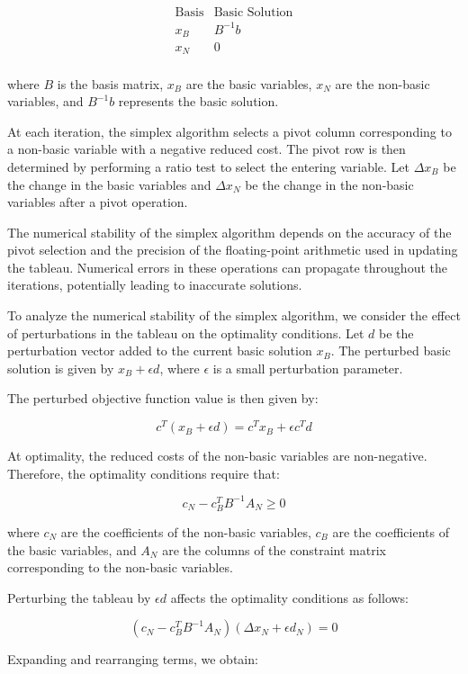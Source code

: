 \documentclass[12pt]{book} %
\begin{document}
\[
\begin{array}{c|c}
\text{Basis} & \text{Basic Solution} \\
\hline
x_B & B^{-1}b \\
\hline
x_N & 0 \\
\end{array}
\]

where $B$ is the basis matrix, $x_B$ are the basic variables, $x_N$ are the non-basic variables, and $B^{-1}b$ represents the basic solution.

At each iteration, the simplex algorithm selects a pivot column corresponding to a non-basic variable with a negative reduced cost. The pivot row is then determined by performing a ratio test to select the entering variable. Let $\Delta x_B$ be the change in the basic variables and $\Delta x_N$ be the change in the non-basic variables after a pivot operation.

The numerical stability of the simplex algorithm depends on the accuracy of the pivot selection and the precision of the floating-point arithmetic used in updating the tableau. Numerical errors in these operations can propagate throughout the iterations, potentially leading to inaccurate solutions.

To analyze the numerical stability of the simplex algorithm, we consider the effect of perturbations in the tableau on the optimality conditions. Let $d$ be the perturbation vector added to the current basic solution $x_B$. The perturbed basic solution is given by $x_B + \epsilon d$, where $\epsilon$ is a small perturbation parameter.

The perturbed objective function value is then given by:

\[
c^T(x_B + \epsilon d) = c^Tx_B + \epsilon c^Td
\]

At optimality, the reduced costs of the non-basic variables are non-negative. Therefore, the optimality conditions require that:

\[
c_N - c_B^TB^{-1}A_N \geq 0
\]

where $c_N$ are the coefficients of the non-basic variables, $c_B$ are the coefficients of the basic variables, and $A_N$ are the columns of the constraint matrix corresponding to the non-basic variables.

Perturbing the tableau by $\epsilon d$ affects the optimality conditions as follows:

\[
(c_N - c_B^TB^{-1}A_N)(\Delta x_N + \epsilon d_N) = 0
\]

Expanding and rearranging terms, we obtain:
\end{document}
